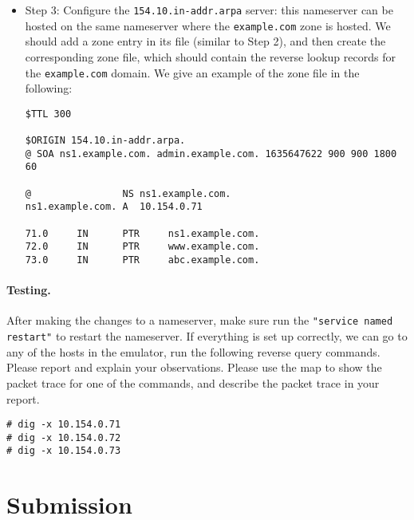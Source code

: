 \begin{itemize}
    

\item Step 3: Configure the \texttt{154.10.in-addr.arpa} server: 
this nameserver can be hosted on the same nameserver
where the \texttt{example.com} zone is hosted.
We should add a zone entry in its 
 file (similar to Step 2), and then
create the corresponding zone file, which should 
contain the reverse lookup records for the \texttt{example.com} domain.
We give an example of the zone file in the following:
    
\begin{lstlisting}
$TTL 300

$ORIGIN 154.10.in-addr.arpa.
@ SOA ns1.example.com. admin.example.com. 1635647622 900 900 1800 60

@                NS ns1.example.com.
ns1.example.com. A  10.154.0.71

71.0     IN      PTR     ns1.example.com.
72.0     IN      PTR     www.example.com.
73.0     IN      PTR     abc.example.com.
\end{lstlisting}
     
\end{itemize}



\paragraph{Testing.}  After making the changes to a nameserver, make sure 
run the \texttt{"service named restart"} to restart the nameserver. If everything
is set up correctly, we can go to any of the hosts in the emulator, 
run the following reverse query commands. Please report and explain 
your observations. Please use the map to show the packet trace
for one of the commands, and describe the packet trace in your report.

\begin{lstlisting}
# dig -x 10.154.0.71
# dig -x 10.154.0.72
# dig -x 10.154.0.73
\end{lstlisting}


 




\section{Submission}

